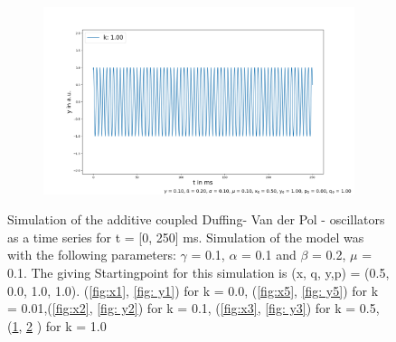 \documentclass[oneside,10pt,a4paper]{report}
\begin{document}
\begin{figure}[H]
\begin{subfigure}[b]{0.45\textwidth}
				\caption{}
				\label{fig:x4}
			\end{subfigure}
			\hfill
			\begin{subfigure}[b]{0.45\textwidth}
				\includegraphics[width=\textwidth]{y_k4.png}
				\caption{}
				\label{fig: y4}
			\end{subfigure}
			\caption{Simulation of the additive coupled Duffing- Van der Pol - oscillators as a time series for t = [0, 250] ms. 
				Simulation of the model was with the following parameters: $\gamma$ = 0.1, $\alpha$ = 0.1 and $\beta$ = 0.2, $\mu$ = 0.1. The giving Startingpoint for this simulation is (x, q, y,p) = (0.5, 0.0, 1.0, 1.0).
				 (\ref{fig:x1}, \ref{fig: y1}) for k = 0.0, (\ref{fig:x5}, \ref{fig: y5}) for k = 0.01,(\ref{fig:x2}, \ref{fig: y2}) for k = 0.1, (\ref{fig:x3}, \ref{fig: y3}) for k = 0.5, (\ref{fig:x4}, \ref{fig: y4} ) for k = 1.0}
			\label{fig: timekurve_k}
		\end{figure}
		
\end{document}
